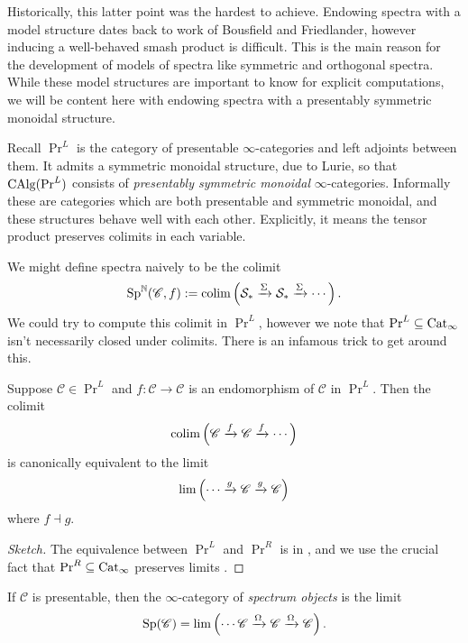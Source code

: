 \documentclass[11pt,openany]{book}
\begin{document}
Historically, this latter point was the hardest to achieve. Endowing spectra with a model structure dates back to work of Bousfield and Friedlander, however inducing a well-behaved smash product is difficult. This is the main reason for the development of models of spectra like symmetric and orthogonal spectra. While these model structures are important to know for explicit computations, we will be content here with endowing spectra with a presentably symmetric monoidal structure.

Recall $\Pr^L$ is the category of presentable $\infty$-categories and left adjoints between them. It admits a symmetric monoidal structure, due to Lurie, so that $\mathrm{CAlg}(\mathrm{Pr}^L)$ consists of \textit{presentably symmetric monoidal} $\infty$-categories. Informally these are categories which are both presentable and symmetric monoidal, and these structures behave well with each other. Explicitly, it means the tensor product preserves colimits in each variable.

We might define spectra naively to be the colimit
\begin{align*}
    \mathrm{Sp}^\mathbb{N}(\mathscr{C},f) := \mathrm{colim} \left( \mathcal{S}_\ast \xrightarrow{\Sigma} \mathcal{S}_\ast \xrightarrow{\Sigma} \cdots \right).
\end{align*}
We could try to compute this colimit in $\Pr^L$, however we note that $\mathrm{Pr}^L \subseteq \mathrm{Cat}_\infty$ isn't necessarily closed under colimits. There is an infamous trick to get around this.

\begin{proposition} Suppose $\mathscr{C} \in\Pr^L$ and $f \colon \mathscr{C} \to \mathscr{C}$ is an endomorphism of $\mathscr{C}$ in $\Pr^L$. Then the colimit
\begin{align*}
    \mathrm{colim} \left( \mathscr{C} \xrightarrow{f} \mathscr{C} \xrightarrow{f} \cdots \right)
\end{align*}
is canonically equivalent to the limit
\begin{align*}
    \lim \left( \cdots \xrightarrow{g} \mathscr{C} \xrightarrow{g} \mathscr{C} \right)
\end{align*}
where $f \dashv g$.
\end{proposition}
\begin{proof}[Sketch] The equivalence between $\Pr^L$ and $\Pr^R$ is in \cite[5.5.3.4]{HTT}, and we use the crucial fact that $\mathrm{Pr}^R \subseteq \mathrm{Cat}_\infty$ preserves limits \cite[5.5.3.18]{HTT}.
\end{proof}

\begin{definition} If $\mathscr{C}$ is presentable, then the $\infty$-category of \textit{spectrum objects} is the limit
\begin{align*}
    \mathrm{Sp}(\mathscr{C}) = \lim \left( \cdots \mathscr{C} \xrightarrow{\Omega} \mathscr{C} \xrightarrow{\Omega} \mathscr{C} \right).
\end{align*}
\end{definition}
\end{document}
